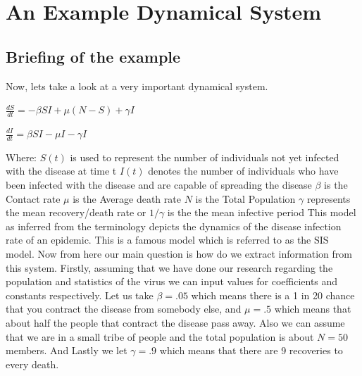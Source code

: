 \documentclass{article}
\begin{document}
\section{An Example Dynamical System}
\subsection{Briefing of the example}
Now, lets take a look at a very important dynamical system. 
\linebreak
\newline
\begin{center}
    \textsc{$\frac{dS}{dt} = - \beta  SI +  \mu (N-S) +  \gamma I$}   
\end{center}
\begin{center}
    \textsc{$ \frac{dI}{dt} = \beta  SI -  \mu I -  \gamma I$} 
\end{center}
Where:
\linebreak
\newline
$S(t)$ is used to represent the number of individuals not yet infected with the disease at time t
\newline
\linebreak
$I(t)$ denotes the number of individuals who have been infected with the disease and are capable of spreading the disease
\newline
\linebreak
$\beta$ is the Contact rate
\newline
\linebreak
$\mu$ is the Average death rate
\newline
\linebreak
$N$ is the Total Population
\newline
\linebreak
$\gamma$ represents the mean recovery/death rate or $1/\gamma$ is the the mean infective period
\newline
\linebreak
This model as inferred from the terminology depicts the dynamics of the disease infection rate of an epidemic. This is a famous model which is referred to as the SIS model.
\newline
\linebreak
Now from here our main question is how do we extract information from this system. Firstly, assuming that we have done our research regarding the population and statistics of the virus we can input values for coefficients and constants respectively.
\newline
\linebreak
Let us take $\beta = .05$ which means there is a 1 in 20 chance that you contract the disease from somebody else, and $\mu = .5$ which means that about half the people that contract the disease pass away. Also we can assume that we are in a small tribe of people and the total population is about $N = 50$ members. And Lastly we let $\gamma = .9$ which means that there are 9 recoveries to every death.
\newpage
\end{document}
